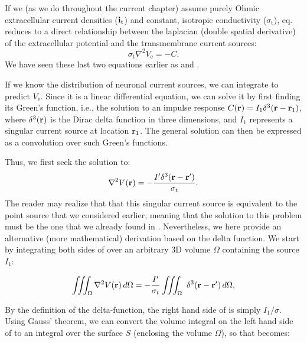 If we (as we do throughout the current chapter) assume purely Ohmic extracellular current densities (${\bf i}_\mathrm{t}$) and constant, isotropic conductivity ($\sigma_\mathrm{t}$), eq.  reduces to a direct relationship between the laplacian (double spatial derivative) of the extracellular potential and the transmembrane current sources: 
\begin{equation}
\sigma_\text{t} \nabla^2{V_\mathrm{e}} = -C.
\label{eq:VC:CSD3}
\end{equation}
We have seen these last two equations earlier as  and . 

If we know the distribution of neuronal current sources, we can integrate  to predict $V_\mathrm{e}$. 
Since it is a linear differential equation, we can solve it by first finding its Green's function, i.e., the solution to an impulse response $C({\bf r}) = I_1 \delta^3({\bf r}-{\bf r}_1)$, where $\delta^3({\bf r})$ is the Dirac delta function in three dimensions, and $I_1$ represents a singular current source at location ${\bf r}_1$. The general solution can then be expressed as a convolution over such Green's functions. 

Thus, we first seek the solution to:
\begin{equation}
\nabla^2 V({\bf r}) = - \frac{I' \delta^3({\bf r-r'})}{\sigma_t}.
\label{eq:VC:CSD5}
\end{equation}
The reader may realize that that this singular current source is equivalent to the point source that we considered earlier, meaning that the solution to this problem must be the one that we already found in . Nevertheless, we here provide an alternative (more mathematical) derivation based on the delta function. We start by integrating both sides of  over an arbitrary 3D volume $\Omega$ containing the source $I_1$:

\begin{equation}
\iiint_{\Omega} \nabla^2V({\bf r}) \,d\Omega =  - \frac{I'}{\sigma_t} \iiint_\Omega \ \delta^3({\bf r-r'}) \, d\Omega,
\label{eq:VC:marit}
\end{equation}

By the definition of the delta-function, the right hand side of  is simply $I_1/\sigma$. Using Gauss' theorem, we can convert the volume integral on the left hand side of  to an integral over the surface $S$ (enclosing the volume $\Omega$), so that  becomes:

